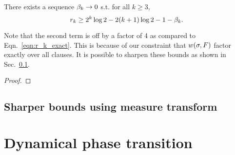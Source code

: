 \documentclass[letterpaper, 10pt, twocolumn, reqno]{amsart}
\begin{document}
\begin{theorem}
There exists a sequence $\beta_k \to 0$ s.t. for all $k \geq 3$,
$$
r_k \geq 2^k \log 2 - 2(k+1) \log 2 - 1 - \beta_k.
$$
\end{theorem}
\begin{remark}
Note that the second term is off by a factor of 4 as compared to Eqn.~\eqref{eqn:r_k_exact}. This is because of our constraint that $w(\sigma,F)$ factor exactly over all clauses. It is possible to sharpen these bounds as shown in Sec.~\ref{ssec:sharper_bounds}. 
\end{remark}
%
\begin{proof}

\end{proof}

\subsection{Sharper bounds using measure transform}
\label{ssec:sharper_bounds}

\begin{remark}
\end{remark}

\section{Dynamical phase transition}
\label{sec:dynamical_transition}
\end{document}
